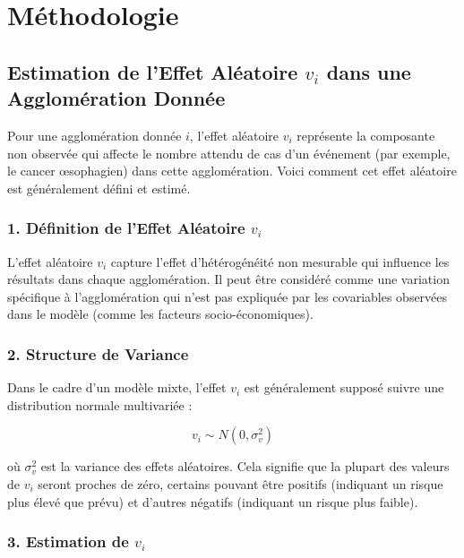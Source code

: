 \documentclass[
]{article}
\author{}
\date{\vspace{-2.5em}}
\begin{document}
\section{Méthodologie}\label{muxe9thodologie}

\subsection{\texorpdfstring{Estimation de l'Effet Aléatoire \(v_i\) dans
une Agglomération
Donnée}{Estimation de l'Effet Aléatoire v\_i dans une Agglomération Donnée}}\label{estimation-de-leffet-aluxe9atoire-v_i-dans-une-agglomuxe9ration-donnuxe9e}

Pour une agglomération donnée \(i\), l'effet aléatoire \(v_i\)
représente la composante non observée qui affecte le nombre attendu de
cas d'un événement (par exemple, le cancer œsophagien) dans cette
agglomération. Voici comment cet effet aléatoire est généralement défini
et estimé.

\subsubsection{\texorpdfstring{1. Définition de l'Effet Aléatoire
\(v_i\)}{1. Définition de l'Effet Aléatoire v\_i}}\label{duxe9finition-de-leffet-aluxe9atoire-v_i}

L'effet aléatoire \(v_i\) capture l'effet d'hétérogénéité non mesurable
qui influence les résultats dans chaque agglomération. Il peut être
considéré comme une variation spécifique à l'agglomération qui n'est pas
expliquée par les covariables observées dans le modèle (comme les
facteurs socio-économiques).

\subsubsection{2. Structure de Variance}\label{structure-de-variance}

Dans le cadre d'un modèle mixte, l'effet \(v_i\) est généralement
supposé suivre une distribution normale multivariée :

\[
v_i \sim N(0, \sigma_v^2)
\]

où \(\sigma_v^2\) est la variance des effets aléatoires. Cela signifie
que la plupart des valeurs de \(v_i\) seront proches de zéro, certains
pouvant être positifs (indiquant un risque plus élevé que prévu) et
d'autres négatifs (indiquant un risque plus faible).

\subsubsection{\texorpdfstring{3. Estimation de
\(v_i\)}{3. Estimation de v\_i}}\label{estimation-de-v_i}
\end{document}
